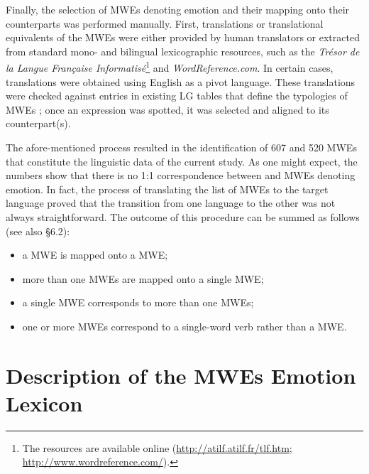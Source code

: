 \documentclass[output=paper]{langsci/langscibook}
\begin{document}
Finally, the selection of  MWEs denoting emotion and their mapping
onto their  counterparts was  performed manually. First,
translations or translational equivalents of the  MWEs were either
provided by human translators or extracted from standard mono- and
bilingual lexicographic \linebreak resources, such as the
\textit{Trésor de la Langue Française
Informatisé}\footnote{The resources are available online 
(\href{http://atilf.atilf.fr/tlf.htm\#_blank}{http://atilf.atilf.fr/tlf.htm};
\url{http://www.wordreference.com/}).} and
\textit{WordReference.com}. In certain cases, translations
were obtained using English as a pivot language. These translations
were checked against entries in existing LG tables that define the
typologies of  MWEs \citep{gross1982}; once an expression was spotted, it
was selected and aligned to its  counterpart(s). 



The afore-mentioned process resulted in the identification of 607 
and 520  MWEs that constitute the linguistic data of the current
study. As one might expect, the numbers show that there is no 1:1
correspondence between  and  MWEs denoting emotion. In fact, the
process of translating the list of  MWEs to the target language
proved that the transition from one language to the other was not
always straightforward. The outcome of this procedure can be summed as
follows (see also §6.2):

\begin{itemize}
\item a  MWE is mapped onto a  MWE;
\item more than one  MWEs are mapped onto a single  MWE;
\item a single  MWE corresponds to more than one  MWEs;
\item one or more  MWEs correspond to a single-word  verb rather than a
MWE.
\end{itemize}


\section{Description of the MWEs Εmotion Lexicon}
\end{document}
